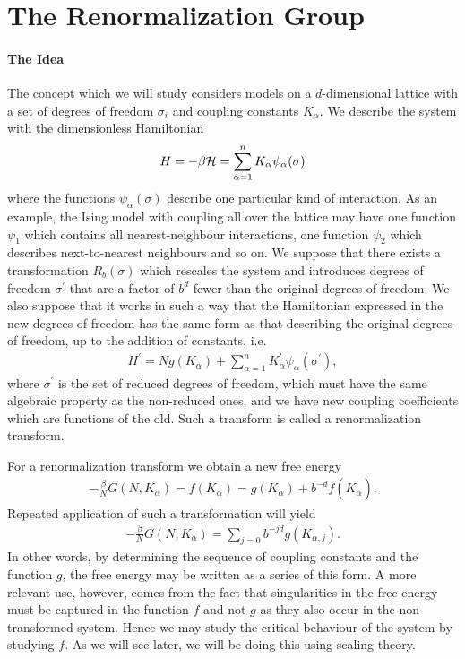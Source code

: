 \section{The Renormalization Group}

\paragraph{The Idea}
The concept which we will study considers models on a $d$-dimensional lattice with a set of degrees of freedom $\sigma_{i}$ and coupling constants $K_{\alpha}$. We describe the system with the dimensionless Hamiltonian
\begin{align*}
	H = -\beta\mathcal{H} = \sum\limits_{\alpha = 1}^{n}K_{\alpha}\psi_{\alpha}(\sigma)
\end{align*}
where the functions $\psi_{\alpha}(\sigma)$ describe one particular kind of interaction. As an example, the Ising model with coupling all over the lattice may have one function $\psi_{1}$ which contains all nearest-neighbour interactions, one function $\psi_{2}$ which describes next-to-nearest neighbours and so on. We suppose that there exists a transformation $R_{b}(\sigma)$ which rescales the system and introduces degrees of freedom $\sigma^{\prime}$ that are a factor of $b^{d}$ fewer than the original degrees of freedom. We also suppose that it works in such a way that the Hamiltonian expressed in the new degrees of freedom has the same form as that describing the original degrees of freedom, up to the addition of constants, i.e.
\begin{align*}
	H^{\prime} = Ng(K_{\alpha}) + \sum\limits_{\alpha = 1}^{n}K_{\alpha}^{\prime}\psi_{\alpha}(\sigma^{\prime}),
\end{align*}
where $\sigma^{\prime}$ is the set of reduced degrees of freedom, which must have the same algebraic property as the non-reduced ones, and we have new coupling coefficients which are functions of the old. Such a transform is called a renormalization transform.

For a renormalization transform we obtain a new free energy
\begin{align*}
	-\frac{\beta}{N}G\left(N, K_{\alpha}\right) = f\left(K_{\alpha}\right) = g(K_{\alpha}) + b^{-d}f\left(K_{\alpha}^{\prime}\right).
\end{align*}
Repeated application of such a transformation will yield
\begin{align*}
	-\frac{\beta}{N}G\left(N, K_{\alpha}\right) = \sum\limits_{j = 0}b^{-jd}g(K_{\alpha, j}).
\end{align*}
In other words, by determining the sequence of coupling constants and the function $g$, the free energy may be written as a series of this form. A more relevant use, however, comes from the fact that singularities in the free energy must be captured in the function $f$ and not $g$ as they also occur in the non-transformed system. Hence we may study the critical behaviour of the system by studying $f$. As we will see later, we will be doing this using scaling theory. 


